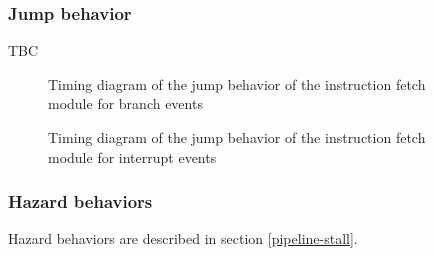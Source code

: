 \subsubsection{Jump behavior}

\begin{content}
  TBC
\end{content}

\begin{figure}[H]
    \centering
    
    \caption{Timing diagram of the jump behavior of the instruction fetch module for branch events}
    \label{fig:ifm-behavior-branch}
\end{figure}

\begin{figure}[H]
    \centering
    
    \caption{Timing diagram of the jump behavior of the instruction fetch module for interrupt events}
    \label{fig:ifm-behavior-interrupt}
\end{figure}

\subsubsection{Hazard behaviors}

\begin{content}
  Hazard behaviors are described in section \ref{pipeline-stall}.
\end{content}

\newpage
